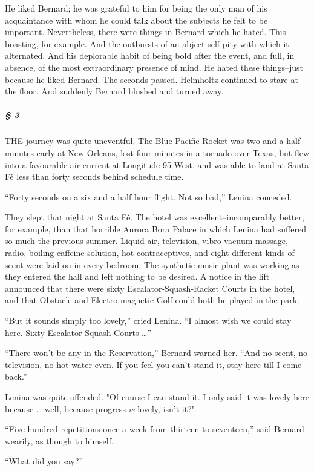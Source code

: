 \documentclass[12pt]{report}
\begin{document}
He liked Bernard; he was grateful to him for being the only man of his
acquaintance with whom he could talk about the subjects he felt to be
important. Nevertheless, there were things in Bernard which he hated.
This boasting, for example. And the outbursts of an abject self-pity
with which it alternated. And his deplorable habit of being bold after
the event, and full, in absence, of the most extraordinary presence of
mind. He hated these things--just because he liked Bernard. The seconds
passed. Helmholtz continued to stare at the floor. And suddenly Bernard
blushed and turned away.

\mbox{}%
\subparagraph{§ 3}\label{section-1}

THE journey was quite uneventful. The Blue Pacific Rocket was two and a
half minutes early at New Orleans, lost four minutes in a tornado over
Texas, but flew into a favourable air current at Longitude 95 West, and
was able to land at Santa Fé less than forty seconds behind schedule
time.

``Forty seconds on a six and a half hour flight. Not so bad,'' Lenina
conceded.

They slept that night at Santa Fé. The hotel was excellent--incomparably
better, for example, than that horrible Aurora Bora Palace in which
Lenina had suffered so much the previous summer. Liquid air, television,
vibro-vacuum massage, radio, boiling caffeine solution, hot
contraceptives, and eight different kinds of scent were laid on in every
bedroom. The synthetic music plant was working as they entered the hall
and left nothing to be desired. A notice in the lift announced that
there were sixty Escalator-Squash-Racket Courts in the hotel, and that
Obstacle and Electro-magnetic Golf could both be played in the park.

``But it sounds simply too lovely,'' cried Lenina. ``I almost wish we
could stay here. Sixty Escalator-Squash Courts \ldots{}''

``There won't be any in the Reservation,'' Bernard warned her. ``And no
scent, no television, no hot water even. If you feel you can't stand it,
stay here till I come back.''

Lenina was quite offended. "Of course I can stand it. I only said it was
lovely here because \ldots{} well, because progress \emph{is} lovely,
isn't it?"

``Five hundred repetitions once a week from thirteen to seventeen,''
said Bernard wearily, as though to himself.

``What did you say?''
\end{document}
